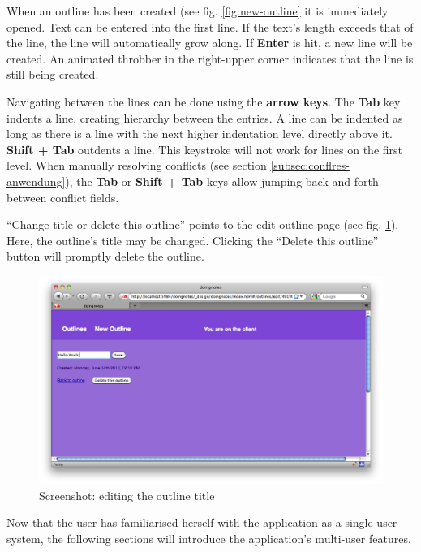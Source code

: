 When an outline has been created (see fig. \ref{fig:new-outline} it is immediately opened. Text can be entered into the first line. If the text's length exceeds that of the line, the line will automatically grow along. If \textbf{Enter} is hit, a new line will be created. An animated throbber in the right-upper corner indicates that the line is still being created.

Navigating between the lines can be done using the \textbf{arrow keys}. The \textbf{Tab} key indents a line, creating hierarchy between the entries. A line can be indented as long as there is a line with the next higher indentation level directly above it. \textbf{Shift + Tab} outdents a line. This keystroke will not work for lines on the first level. When manually resolving conflicts (see section \ref{subsec:conflres-anwendung}), the \textbf{Tab} or \textbf{Shift + Tab} keys allow jumping back and forth between conflict fields.

\enquote{Change title or delete this outline} points to the edit outline page (see fig. \ref{fig:edit-outline}). Here, the outline's title may be changed. Clicking the \enquote{Delete this outline} button will promptly delete the outline.

\medskip
\begin{figure}[ht] 
  \begin{center}
    \includegraphics[width=\textwidth]{grafik/screenshot-edit-outline} 
  \end{center}
  \caption{Screenshot: editing the outline title}
  \label{fig:edit-outline} 
\end{figure}

Now that the user has familiarised herself with the application as a single-user system, the following sections will introduce the application's multi-user features.

